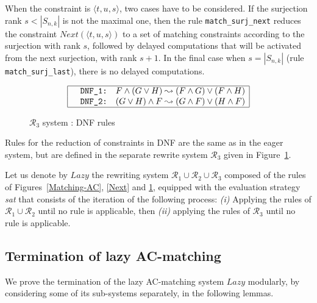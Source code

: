 \documentclass[submission,copyright,creativecommons]{eptcs}
\newcommand \trip[1]{\langle #1 \rangle}
\numberwithin{subcase}{case}
\begin{document}
When the constraint is $\trip{t,u,s}$, two cases have to be considered.  If the
surjection rank $s <|S_{n,k}|$ is not the maximal one, then the rule
\texttt{match\_surj\_next} reduces the constraint
$\textit{Next}(\trip{t,u,{s}})$ to a set of matching constraints according to
the surjection with rank $s$,
 followed by  delayed computations that will
be activated from the next surjection, with rank $s+1$.
In the final case when $s=|S_{n,k}|$ (rule \texttt{match\_surj\_last}), there is
no delayed computations.
 
\begin{figure}[hbt!]
\begin{align*}
\begin{array}{|l l l|}
\hline
&\texttt{DNF\_1:}&  F \land (G\lor H) \leadsto (F \land G) \lor (F \land H)\\
&\texttt{DNF\_2:} &  (G\lor H) \land F \leadsto (G \land F) \lor (H \land F)\\
\hline
\end{array}
\end{align*}
\caption{$\mathcal{R}_3$ system : DNF  rules \label{Simplify}}
\end{figure}

Rules for the reduction of constraints in DNF are the same as in the eager
system, but are defined in the separate rewrite system $\mathcal{R}_3$ given in
Figure~\ref{Simplify}.


Let us denote by $\textit{Lazy}$ the
rewriting system $\mathcal{R}_1\cup \mathcal{R}_2 \cup \mathcal{R}_3$ composed of the 
 rules of Figures~\ref{Matching-AC}, \ref{Next} and
 \ref{Simplify}, equipped with the evaluation strategy \emph{sat} that consists of 
the iteration of the following process:
\emph{(i)} Applying the rules of $\mathcal{R}_1\cup \mathcal{R}_2$ until no
rule is applicable, then \emph{(ii)} applying the rules of $\mathcal{R}_3$
until no rule is applicable.



\subsection{Termination of lazy AC-matching}
We prove the termination of the lazy AC-matching system $\textit{Lazy}$
modularly, by considering some of its sub-systems separately, in the following lemmas. 
\end{document}

